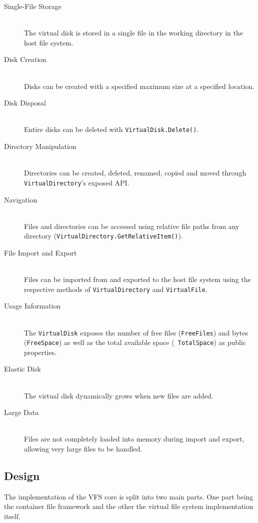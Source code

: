 \documentclass{scrartcl}
\begin{document}
	\begin{description}
	\item[Single-File Storage] \ \\
		The virtual disk is stored in a single file in the working directory in
		the host file system.
	\item[Disk Creation] \ \\
		Disks can be created with a specified maximum size at a specified location.
	\item[Disk Disposal] \ \\
		Entire disks can be deleted with {\tt VirtualDisk.Delete()}.
	\item[Directory Manipulation] \ \\
		Directories can be created, deleted, renamed, copied and moved through {\tt
		VirtualDirectory}'s exposed API.
	\item[Navigation] \ \\
		Files and directories can be accessed using relative file paths from
		any directory ({\tt VirtualDirectory.GetRelativeItem()}).
	\item[File Import and Export] \ \\
		Files can be imported from and exported to the host file system using the
		respective methods of {\tt VirtualDirectory} and {\tt VirtualFile}.
	\item[Usage Information] \ \\
		The {\tt VirtualDisk} exposes the number of free files ({\tt FreeFiles}) and
		bytes ({\tt FreeSpace}) as well as the total available space ({\tt
		TotalSpace}) as public properties.
	\item[Elastic Disk] \ \\
		The virtual disk dynamically grows when new files are added.
	\item[Large Data] \ \\
		Files are not completely loaded into memory during import and export, allowing
		very large files to be handled.
	\end{description}

\subsection{Design}
The implementation of the VFS core is split into two main parts. One part being
the container file framework and the other the virtual file system implementation itself.
\end{document}
